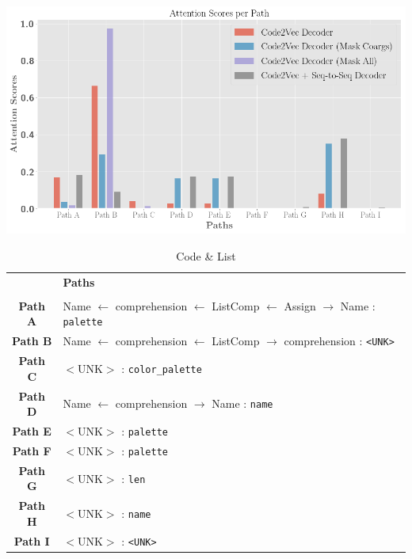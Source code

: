 \begin{table}[ht!]
\begin{center}

\includegraphics[width=0.9\linewidth]{ImagesCodeRelated/pretty_attention_XKCD.png}
\begingroup
    \fontsize{10pt}{12pt}\selectfont
\begin{tabular}{c l}
    & \textbf{Paths} \\
    \\
    \textbf{Path A} & Name $\leftarrow$ comprehension $\leftarrow$ ListComp $\leftarrow$ Assign $\rightarrow$ Name : \texttt{palette} \\
    \textbf{Path B} & Name $\leftarrow$ comprehension $\leftarrow$ ListComp $\rightarrow$ comprehension : \texttt{<UNK>} \\
    \textbf{Path C} & $<$UNK$>$ : \texttt{color_palette} \\
    \textbf{Path D} & Name $\leftarrow$ comprehension $\rightarrow$ Name : \texttt{name} \\
    \textbf{Path E} & $<$UNK$>$ : \texttt{palette} \\
    \textbf{Path F} & $<$UNK$>$ : \texttt{palette} \\
    \textbf{Path G} & $<$UNK$>$ : \texttt{len} \\
    \textbf{Path H} & $<$UNK$>$ : \texttt{name} \\
    \textbf{Path I} & $<$UNK$>$ : \texttt{<UNK>} \\
\end{tabular}
\endgroup


\end{center}
\caption{Code \& List}
\label{fig:single_examples}
\end{table}


